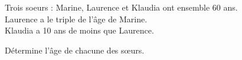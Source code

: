 %
%
    Trois soeurs : Marine, Laurence et Klaudia ont ensemble 60 ans.\\
    Laurence a le triple de l'âge de Marine.\\
    Klaudia a 10 ans de moins que Laurence.\par
    Détermine l'âge de chacune des s{\oe}urs.
